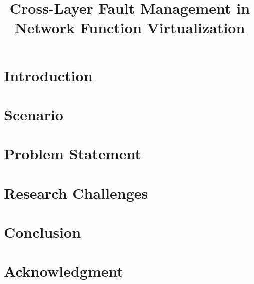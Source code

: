 \documentclass[a4paper,twocolumn,conference]{IEEEtran}
\begin{document}

\title{Cross-Layer Fault Management in Network Function Virtualization}

\author{
}

\maketitle

\begin{abstract}
	
\end{abstract}

\IEEEpeerreviewmaketitle

\section{Introduction}
	

\section{Scenario}
	
%
\section{Problem Statement}
	

\section{Research Challenges}
	

\section{Conclusion}


\section*{Acknowledgment}



\end{document}
